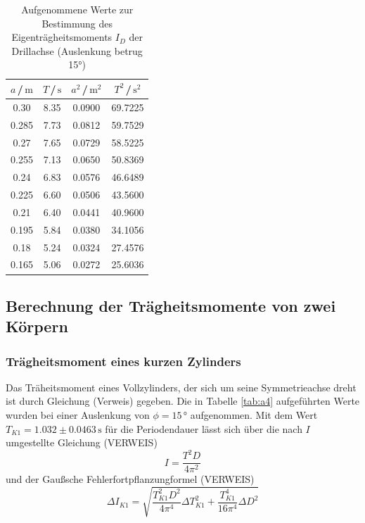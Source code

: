 \begin{table}[H]
\normalsize

\centering
{}
\begin{tabular}{c c c c}
\toprule
    $a$\,/\,$\si{\meter}$ &  $T$\,/\,$\si{\second}$ & $a^2$\,/\,$\si{\meter}^2$ &  $T^2$\,/\,$\si{\second}^2$ \\
    \midrule

0.30  &   8.35 &  0.0900      & 69.7225\\
0.285 &   7.73 &  0.0812  & 59.7529\\
0.27  &   7.65 &  0.0729    & 58.5225\\
0.255 &   7.13 &  0.0650  & 50.8369\\
0.24  &   6.83 &  0.0576    & 46.6489\\
0.225 &   6.60 &  0.0506  & 43.5600\\
0.21  &   6.40 &  0.0441    & 40.9600\\
0.195 &   5.84 &  0.0380  & 34.1056\\
0.18  &   5.24 &  0.0324    & 27.4576\\
0.165 &   5.06 &  0.0272  & 25.6036\\ 

    \bottomrule
\end{tabular}
\caption{Aufgenommene Werte zur Bestimmung des Eigenträgheitsmoments $I_{D}$ der Drillachse (Auslenkung betrug 15°)}
\label{tab:a2}
\end{table}





\subsection{Berechnung der Trägheitsmomente von zwei Körpern}

\subsubsection{Trägheitsmoment eines kurzen Zylinders}

Das Träheitsmoment eines Vollzylinders, der sich um seine Symmetrieachse dreht ist durch 
Gleichung (Verweis) gegeben. Die in Tabelle \ref{tab:a4} aufgeführten Werte wurden bei einer 
Auslenkung von $\phi = 15\,°$ aufgenommen. Mit dem Wert $T_{K1} = 1.032 \pm 0.0463\, \si{\second}$
für die Periodendauer lässt sich über die nach $I$ umgestellte Gleichung (VERWEIS)
\begin{equation}
    I = \frac{T^2 D}{4 \pi^2}
\end{equation}
und der Gaußsche Fehlerfortpflanzungformel (VERWEIS)
\begin{equation} 
    \Delta I_{K1} = \sqrt{\frac{T_{K1}^2 D^2}{4 \pi^4}\Delta T_{K1}^2 + \frac{T_{K1}^4}{16 \pi^4}\Delta D^2} 
\end{equation}



